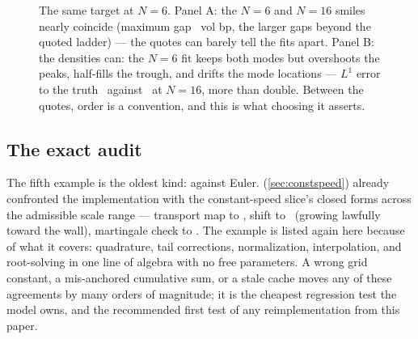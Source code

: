 \begin{figure}[htbp]
\centering
{}
\caption{The same target at $N=6$.  Panel A: the $N=6$ and $N=16$
smiles nearly coincide (maximum gap \MacHumpIvAgreeBp\ vol bp, the
larger gaps beyond the quoted ladder) --- the quotes can barely tell
the fits apart.  Panel B: the densities can: the $N=6$ fit keeps both
modes but overshoots the peaks, half-fills the trough, and drifts the
mode locations --- $L^1$ error to the truth \MacHumpLOneNSix\ against
\MacHumpLOneNSixteen\ at $N=16$, more than double.  Between the quotes,
order is a convention, and this is what choosing it asserts.}
\label{fig:order_control}
\end{figure}

\subsection{The exact audit}

The fifth example is the oldest kind: against Euler.
 (\cref{sec:constspeed}) already confronted the
implementation with the constant-speed slice's closed forms across the
admissible scale range --- transport map to \MacExactMapWorst, shift to
\MacExactMuWorst\ (growing lawfully toward the wall), martingale check
to \MacExactMartWorst.  The example is listed again here because of
what it covers: quadrature, tail corrections, normalization,
interpolation, and root-solving in one line of algebra with no free
parameters.  A wrong grid constant, a mis-anchored cumulative sum, or a
stale cache moves any of these agreements by many orders of magnitude;
it is the cheapest regression test the model owns, and the recommended
first test of any reimplementation from this paper.
